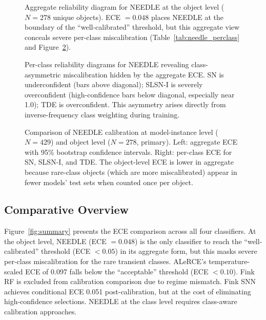 \documentclass[twocolumn]{aastex631}
\begin{document}
\begin{figure}
\caption{Aggregate reliability diagram for NEEDLE at the object level ($N = 278$ unique objects). ECE $= 0.048$ places NEEDLE at the boundary of the ``well-calibrated'' threshold, but this aggregate view conceals severe per-class miscalibration (Table~\ref{tab:needle_perclass} and Figure~\ref{fig:needle_perclass}). \label{fig:needle_aggregate}}
\end{figure}

\begin{figure}
\caption{Per-class reliability diagrams for NEEDLE revealing class-asymmetric miscalibration hidden by the aggregate ECE. SN is underconfident (bars above diagonal); SLSN-I is severely overconfident (high-confidence bars below diagonal, especially near 1.0); TDE is overconfident. This asymmetry arises directly from inverse-frequency class weighting during training. \label{fig:needle_perclass}}
\end{figure}

\begin{figure}
\caption{Comparison of NEEDLE calibration at model-instance level ($N = 429$) and object level ($N = 278$, primary). Left: aggregate ECE with 95\% bootstrap confidence intervals. Right: per-class ECE for SN, SLSN-I, and TDE. The object-level ECE is lower in aggregate because rare-class objects (which are more miscalibrated) appear in fewer models' test sets when counted once per object. \label{fig:needle_comparison}}
\end{figure}

\subsection{Comparative Overview}

Figure~\ref{fig:summary} presents the ECE comparison across all four classifiers. At the object level, NEEDLE (ECE $= 0.048$) is the only classifier to reach the ``well-calibrated'' threshold (ECE $< 0.05$) in its aggregate form, but this masks severe per-class miscalibration for the rare transient classes. ALeRCE's temperature-scaled ECE of 0.097 falls below the ``acceptable'' threshold (ECE $< 0.10$). Fink RF is excluded from calibration comparison due to regime mismatch. Fink SNN achieves conditional ECE 0.051 post-calibration, but at the cost of eliminating high-confidence selections. NEEDLE at the class level requires class-aware calibration approaches.
\end{document}
